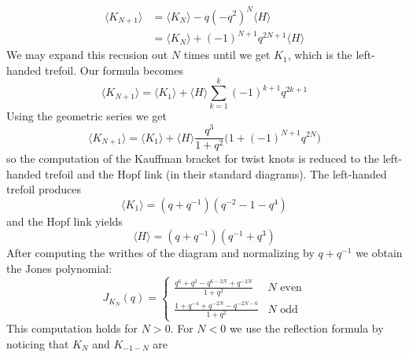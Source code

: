             \begin{align}
                \langle{K_{N+1}}\rangle
                &=\langle{K_{N}}\rangle
                -q(-q^{2})^{N}\langle{H}\rangle\\
                &=\langle{K_{N}}\rangle
                +(-1)^{N+1}q^{2N+1}\langle{H}\rangle
            \end{align}
            We may expand this recusion out $N$ times until we get $K_{1}$,
            which is the left-handed trefoil. Our formula becomes
            \begin{equation}
                \langle{K_{N+1}}\rangle
                =\langle{K_{1}}\rangle
                +\langle{H}\rangle
                \sum_{k=1}^{k}(-1)^{k+1}q^{2k+1}
            \end{equation}
            Using the geometric series we get
            \begin{equation}
                \langle{K_{N+1}}\rangle
                =\langle{K_{1}}\rangle+\langle{H}\rangle
                \frac{q^{3}}{1+q^{2}}\big(1+(-1)^{N+1}q^{2N}\big)
            \end{equation}
            so the computation of the Kauffman bracket for twist knots is
            reduced to the left-handed trefoil and the Hopf link (in their
            standard diagrams). The left-handed trefoil produces
            \begin{equation}
                \langle{K_{1}}\rangle=(q+q^{-1})(q^{-2}-1-q^{4})
            \end{equation}
            and the Hopf link yields
            \begin{equation}
                \langle{H}\rangle=
                (q+q^{-1})(q^{-1}+q^{3})
            \end{equation}
            After computing the writhes of the diagram and normalizing
            by $q+q^{-1}$ we obtain the Jones polynomial:
            \begin{equation}
                J_{K_{N}}(q)
                =\begin{cases}
                    \frac{q^{6}+q^{2}-q^{6-2N}+q^{-2N}}{1+q^{2}}
                    &N\textrm{ even}\\
                    \frac{1+q^{-4}+q^{-2N}-q^{-2N-6}}{1+q^{2}}
                    &N\textrm{ odd}
                \end{cases}
            \end{equation}
            This computation holds for $N>0$. For $N<0$ we use the
            reflection formula by noticing that $K_{N}$ and $K_{-1-N}$ are
